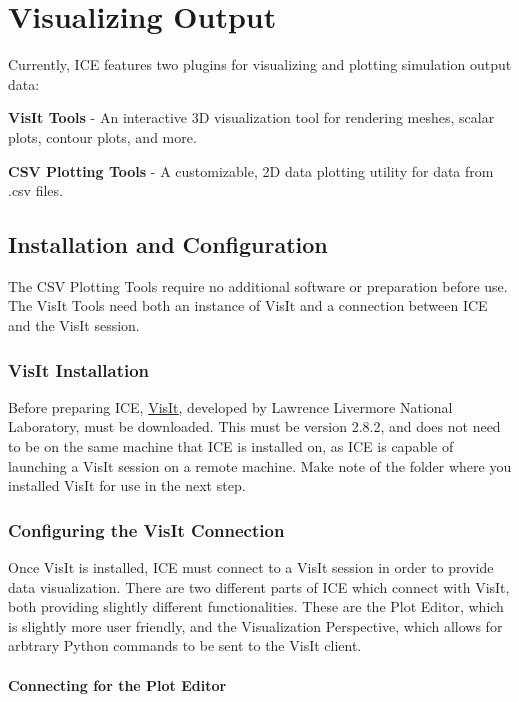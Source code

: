 \documentclass{article}
\begin{document}
\section{Visualizing Output}

Currently, ICE features two plugins for visualizing and plotting simulation
output data:

\textbf{VisIt Tools} - An interactive 3D visualization tool for rendering
meshes, scalar plots, contour plots, and more. 

\textbf{CSV Plotting Tools} - A customizable, 2D data plotting utility for data 
from .csv files.

\subsection{Installation and Configuration}

The CSV Plotting Tools require no additional software or preparation before use.
The VisIt Tools need both an instance of VisIt and a connection between ICE and
the VisIt session.

\subsubsection{VisIt Installation} 

Before preparing ICE,
\href{https://wci.llnl.gov/simulation/computer-codes/visit/}{VisIt}, developed
by Lawrence Livermore National Laboratory, must be downloaded. This must be
version 2.8.2, and does not need to be on the same machine that ICE is installed
on, as ICE is capable of launching a VisIt session on a remote machine. Make
note of the folder where you installed VisIt for use in the next step.

\subsubsection{Configuring the VisIt Connection}

Once VisIt is installed, ICE must connect to a VisIt session in order to provide
data visualization. There are two different parts of ICE which connect with
VisIt, both providing slightly different functionalities. These are the Plot
Editor, which is slightly more user friendly, and the Visualization Perspective,
which allows for arbtrary Python commands to be sent to the VisIt client. 

\paragraph{Connecting for the Plot Editor}
\end{document}
